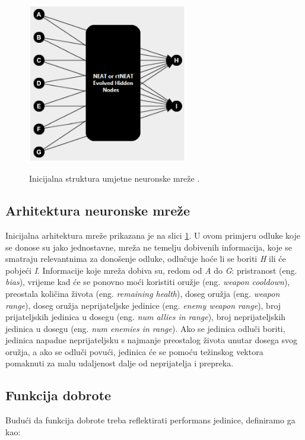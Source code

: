 \documentclass[times, utf8, seminar, numeric]{fer}
\begin{document}
\begin{figure}[ht]
  \centering
  \includegraphics[height=7cm]{slika6}\\
  \caption{Inicijalna struktura umjetne neuronske mreže \citep{rad5}.}
  \label{slika6}
\end{figure}

\subsection{Arhitektura neuronske mreže}
Inicijalna arhitektura mreže prikazana je na slici \ref{slika6}. U ovom primjeru odluke koje se donose su jako jednostavne, mreža ne temelju dobivenih informacija, koje se smatraju relevantnima za donošenje odluke, odlučuje hoće li se boriti \textit{H} ili će pobjeći \textit{I}. Informacije koje mreža dobiva su, redom od \textit{A} do \textit{G}: pristranost (eng. \textit{bias}), vrijeme kad će se ponovno moći koristiti oružje (eng. \textit{weapon cooldown}), preostala količina života (eng. \textit{remaining health}), doseg oružja (eng. \textit{weapon range}), doseg oružja neprijateljske jedinice (eng. \textit{enemy weapon range}), broj prijateljskih jedinica u dosegu (eng. \textit{num allies in range}), broj neprijateljskih jedinica u dosegu (eng. \textit{num enemies in range}). Ako se jedinica odluči boriti, jedinica napadne neprijateljsku s najmanje preostalog života unutar dosega svog oružja, a ako se odluči povući, jedinica će se pomoću težinskog vektora pomaknuti za malu udaljenost dalje od neprijatelja i prepreka.

\subsection{Funkcija dobrote}
Budući da funkcija dobrote treba reflektirati performans jedinice, definiramo ga kao:
\end{document}
